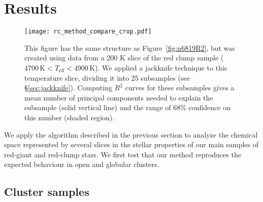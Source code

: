 \documentclass[a4paper,fleqn,usenatbib]{mnras}
\newcommand       \teff     {{T_{\mathrm{eff}}}}
\newcommand       \Rsq      {{R^2}}
\begin{document}
\section{Results}

\begin{figure*}
\centering
\texttt{[image: rc\_method\_compare\_crop.pdf]}
\caption{This figure has the same structure as Figure~\ref{fig:n6819R2}, but was created using data from a 200 K slice of the red clump sample ($4700\,\mathrm{K} < \teff < 4900\,\mathrm{K}$). We applied a jackknife technique to this temperature slice, dividing it into 25 subsamples (see \S\ref{sec:jackknife}). Computing $\Rsq$ curves for these subsamples gives a mean number of principal components needed to explain the subsample (solid vertical line) and the range of 68\% confidence on this number (shaded region).}
\label{fig:R2RC}
\end{figure*}

\label{sec:app}

We apply the algorithm described in the previous section to analyze the chemical space represented by several slices in the stellar properties of our main samples of red-giant and red-clump stars. We first test that our method reproduces the expected behaviour in open and globular clusters.

\subsection{Cluster samples}

\label{sec:OC}
\end{document}
